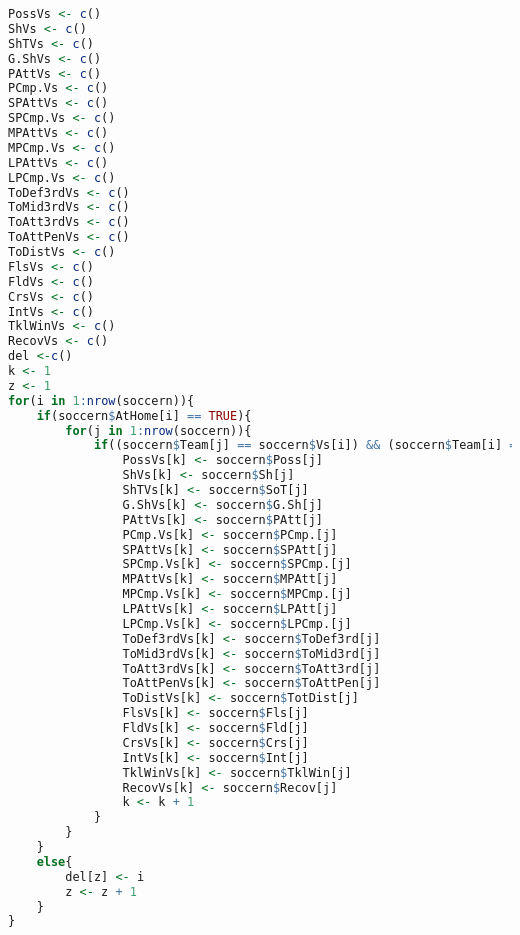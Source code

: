 \begin{lstlisting}[language=R]
PossVs <- c()
ShVs <- c()
ShTVs <- c()
G.ShVs <- c()
PAttVs <- c()
PCmp.Vs <- c()
SPAttVs <- c()
SPCmp.Vs <- c()
MPAttVs <- c()
MPCmp.Vs <- c()
LPAttVs <- c()
LPCmp.Vs <- c()
ToDef3rdVs <- c()
ToMid3rdVs <- c()
ToAtt3rdVs <- c()
ToAttPenVs <- c()
ToDistVs <- c()
FlsVs <- c()
FldVs <- c()
CrsVs <- c()
IntVs <- c()
TklWinVs <- c()
RecovVs <- c()
del <-c()
k <- 1
z <- 1
for(i in 1:nrow(soccern)){
	if(soccern$AtHome[i] == TRUE){
		for(j in 1:nrow(soccern)){
			if((soccern$Team[j] == soccern$Vs[i]) && (soccern$Team[i] == soccern$Vs[j]) && (soccern$AtHome[j] == FALSE)){
				PossVs[k] <- soccern$Poss[j]
				ShVs[k] <- soccern$Sh[j]
				ShTVs[k] <- soccern$SoT[j]
				G.ShVs[k] <- soccern$G.Sh[j]
				PAttVs[k] <- soccern$PAtt[j]
				PCmp.Vs[k] <- soccern$PCmp.[j]
				SPAttVs[k] <- soccern$SPAtt[j]
				SPCmp.Vs[k] <- soccern$SPCmp.[j]
				MPAttVs[k] <- soccern$MPAtt[j]
				MPCmp.Vs[k] <- soccern$MPCmp.[j]
				LPAttVs[k] <- soccern$LPAtt[j]
				LPCmp.Vs[k] <- soccern$LPCmp.[j]
				ToDef3rdVs[k] <- soccern$ToDef3rd[j]
				ToMid3rdVs[k] <- soccern$ToMid3rd[j]
				ToAtt3rdVs[k] <- soccern$ToAtt3rd[j]
				ToAttPenVs[k] <- soccern$ToAttPen[j]
				ToDistVs[k] <- soccern$TotDist[j]
				FlsVs[k] <- soccern$Fls[j]
				FldVs[k] <- soccern$Fld[j]
				CrsVs[k] <- soccern$Crs[j]
				IntVs[k] <- soccern$Int[j]
				TklWinVs[k] <- soccern$TklWin[j]
				RecovVs[k] <- soccern$Recov[j]
				k <- k + 1
			}      
		}
	}
	else{
		del[z] <- i
		z <- z + 1
	}
}
\end{lstlisting}
\bigskip

